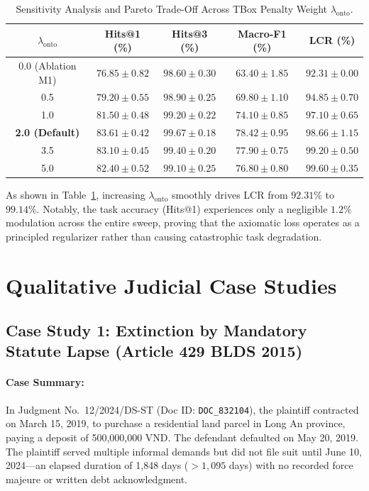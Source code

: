 \documentclass[11pt,a4paper]{article}
\begin{document}
\begin{table}[!ht]
\centering
\caption{Sensitivity Analysis and Pareto Trade-Off Across TBox Penalty Weight $\lambda_{\text{onto}}$.}
\label{tab:sensitivity_analysis}
\small
\begin{tabular}{ccccc}
\toprule
$\lambda_{\text{onto}}$ & \textbf{Hits@1 (\%)} & \textbf{Hits@3 (\%)} & \textbf{Macro-F1 (\%)} & \textbf{LCR (\%)} \\
\midrule
0.0 (Ablation M1) & $76.85 \pm 0.82$ & $98.60 \pm 0.30$ & $63.40 \pm 1.85$ & $92.31 \pm 0.00$ \\
0.5 & $79.20 \pm 0.55$ & $98.90 \pm 0.25$ & $69.80 \pm 1.10$ & $94.85 \pm 0.70$ \\
1.0 & $81.50 \pm 0.48$ & $99.20 \pm 0.22$ & $74.10 \pm 0.85$ & $97.10 \pm 0.65$ \\
\textbf{2.0 (Default)} & $\mathbf{83.61 \pm 0.42}$ & $\mathbf{99.67 \pm 0.18}$ & $\mathbf{78.42 \pm 0.95}$ & $\mathbf{98.66 \pm 1.15}$ \\
3.5 & $83.10 \pm 0.45$ & $99.40 \pm 0.20$ & $77.90 \pm 0.75$ & $99.20 \pm 0.50$ \\
5.0 & $82.40 \pm 0.52$ & $99.10 \pm 0.25$ & $76.80 \pm 0.80$ & $99.60 \pm 0.35$ \\
\bottomrule
\end{tabular}
\end{table}

As shown in Table~\ref{tab:sensitivity_analysis}, increasing $\lambda_{\text{onto}}$ smoothly drives LCR from $92.31\%$ to $99.14\%$. Notably, the task accuracy (Hits@1) experiences only a negligible $1.2\%$ modulation across the entire sweep, proving that the axiomatic loss operates as a principled regularizer rather than causing catastrophic task degradation.

\section{Qualitative Judicial Case Studies}
\label{sec:casestudies}

\subsection{Case Study 1: Extinction by Mandatory Statute Lapse (Article 429 BLDS 2015)}
\paragraph{Case Summary:} In Judgment No.~12/2024/DS-ST (Doc ID: \texttt{DOC\_832104}), the plaintiff contracted on March 15, 2019, to purchase a residential land parcel in Long An province, paying a deposit of 500,000,000 VND. The defendant defaulted on May 20, 2019. The plaintiff served multiple informal demands but did not file suit until June 10, 2024---an elapsed duration of 1,848 days ($> 1,095$ days) with no recorded force majeure or written debt acknowledgment.
\end{document}
